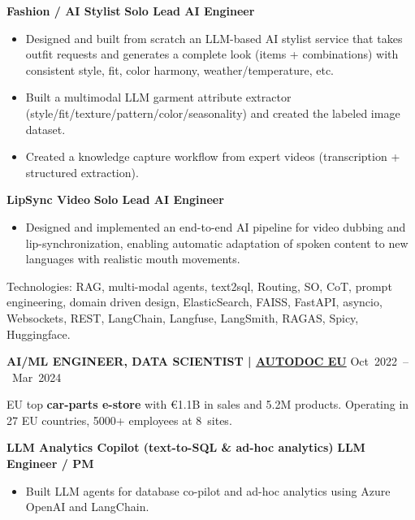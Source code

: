\documentclass[a4paper,12pt]{article}
\begin{document}
\noindent\textbf{Fashion / AI Stylist}
\hfill \textbf{Solo Lead AI Engineer}\par
\begin{itemize}[nosep,leftmargin=1em,itemsep=2pt]
  \item[--] Designed and built from scratch an LLM-based AI stylist service that takes outfit requests and generates a complete look (items + combinations) with consistent style, fit, color harmony, weather/temperature, etc.
  \item[--] Built a multimodal LLM garment attribute extractor (style/fit/texture/pattern/color/seasonality) and created the labeled image dataset.
  \item[--] Created a knowledge capture workflow from expert videos (transcription + structured extraction).
\end{itemize}

\noindent\textbf{LipSync Video}
\hfill \textbf{Solo Lead AI Engineer}\par
\begin{itemize}[nosep,leftmargin=1em,itemsep=2pt]
    \item[--]  Designed and implemented an end-to-end AI pipeline for video dubbing and lip-synchronization, enabling automatic adaptation of spoken content to new languages with realistic mouth movements.
\end{itemize}

\footnotesize Technologies: RAG, multi-modal agents, text2sql, Routing, SO, CoT, prompt engineering, domain driven design, ElasticSearch, FAISS, FastAPI,
asyncio, Websockets, REST, LangChain, Langfuse, LangSmith, RAGAS, Spicy, Huggingface.\par
\vspace{6pt}


\vspace{6pt}
\noindent\textbf{AI/ML ENGINEER, DATA SCIENTIST | \href{https://www.autodoc.eu/}{AUTODOC EU}}
\hfill \mbox{Oct 2022 -- Mar 2024}\par
\footnotesize EU top \textbf{car-parts e-store} with €1.1B in sales and 5.2M products. Operating in 27 EU countries, 5000+ employees at 8~sites.\par

\noindent\textbf{LLM Analytics Copilot (text-to-SQL \& ad-hoc analytics)}
\hfill \textbf{LLM Engineer / PM}\par
\begin{itemize}[nosep,leftmargin=1em,itemsep=2pt]
  \item[--] Built LLM agents for database co-pilot and ad-hoc analytics using Azure OpenAI and LangChain.
\end{itemize}
\end{document}
